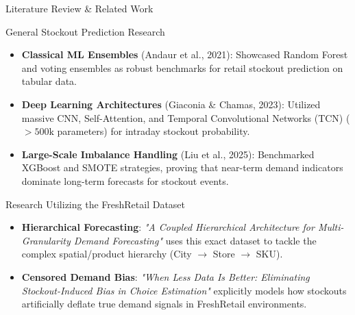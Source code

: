 \documentclass[10pt, aspectratio=169]{beamer}
\begin{document}
\begin{frame}{Literature Review \& Related Work}
  \begin{block}{General Stockout Prediction Research}
    \small
    \begin{itemize}
      \item \textbf{Classical ML Ensembles} (Andaur et al., 2021): Showcased Random Forest and voting ensembles as robust benchmarks for retail stockout prediction on tabular data.
      \item \textbf{Deep Learning Architectures} (Giaconia \& Chamas, 2023): Utilized massive CNN, Self-Attention, and Temporal Convolutional Networks (TCN) ($>500\text{k}$ parameters) for intraday stockout probability.
      \item \textbf{Large-Scale Imbalance Handling} (Liu et al., 2025): Benchmarked XGBoost and SMOTE strategies, proving that near-term demand indicators dominate long-term forecasts for stockout events.
    \end{itemize}
  \end{block}

  \vspace{0.2cm}

  \begin{block}{Research Utilizing the FreshRetail Dataset}
    \small
    \begin{itemize}
      \item \textbf{Hierarchical Forecasting}: \textit{"A Coupled Hierarchical Architecture for Multi-Granularity Demand Forecasting"} uses this exact dataset to tackle the complex spatial/product hierarchy (City $\rightarrow$ Store $\rightarrow$ SKU).
      \item \textbf{Censored Demand Bias}: \textit{"When Less Data Is Better: Eliminating Stockout-Induced Bias in Choice Estimation"} explicitly models how stockouts artificially deflate true demand signals in FreshRetail environments.
    \end{itemize}
  \end{block}
\end{frame}
\end{document}
